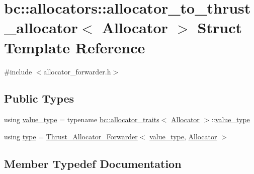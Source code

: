 \hypertarget{structbc_1_1allocators_1_1allocator__to__thrust__allocator}{}\section{bc\+:\+:allocators\+:\+:allocator\+\_\+to\+\_\+thrust\+\_\+allocator$<$ Allocator $>$ Struct Template Reference}
\label{structbc_1_1allocators_1_1allocator__to__thrust__allocator}


{\ttfamily \#include $<$allocator\+\_\+forwarder.\+h$>$}

\subsection*{Public Types}
\begin{DoxyCompactItemize}
\item 
using \hyperlink{structbc_1_1allocators_1_1allocator__to__thrust__allocator_a3d6121959fbf5322c74a82a473d21492}{value\+\_\+type} = typename \hyperlink{structbc_1_1allocators_1_1allocator__traits}{bc\+::allocator\+\_\+traits}$<$ \hyperlink{classbc_1_1allocators_1_1Allocator}{Allocator} $>$\+::\hyperlink{structbc_1_1allocators_1_1allocator__to__thrust__allocator_a3d6121959fbf5322c74a82a473d21492}{value\+\_\+type}
\item 
using \hyperlink{structbc_1_1allocators_1_1allocator__to__thrust__allocator_a6825abb5bb34ca66088ca65b7dcd0ebc}{type} = \hyperlink{structbc_1_1allocators_1_1Thrust__Allocator__Forwarder}{Thrust\+\_\+\+Allocator\+\_\+\+Forwarder}$<$ \hyperlink{structbc_1_1allocators_1_1allocator__to__thrust__allocator_a3d6121959fbf5322c74a82a473d21492}{value\+\_\+type}, \hyperlink{classbc_1_1allocators_1_1Allocator}{Allocator} $>$
\end{DoxyCompactItemize}


\subsection{Member Typedef Documentation}
\mbox{\label{structbc_1_1allocators_1_1allocator__to__thrust__allocator_a6825abb5bb34ca66088ca65b7dcd0ebc}} 
